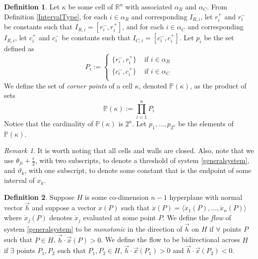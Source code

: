\documentclass[12pt]{article}
\theoremstyle{definition}
\newtheorem{defn}{Definition}[section]
\theoremstyle{remark}
\newtheorem*{remark}{Remark}
\newcommand{\bbR}{\mathbb{R}} %
\newcommand{\bbP}{\mathbb{P}}
\begin{document}
\begin{defn}
Let $\kappa$ be some cell of $\bbR^n$ with associated $\alpha_R$ and $\alpha_C$. From Definition \ref{IntervalType}, for each $i\in\alpha_R$ and corresponding $I_{R,i}$, let $r_i^+$ and $r_i^-$ be constants such that $I_{R,i}=[r_i^-,r_i^+]$, and for each $i\in\alpha_C$ and corresponding $I_{R,i}$, let $c_i^+$ and $c_i^-$ be constants such that $I_{C,i}=[c_i^-,c_i^+]$. Let $p_i$ be the set defined as 
\begin{equation*}
P_i :=
\begin{cases}
\{r_i^-,r_i^+\} &  \text{ if } i\in \alpha_R \\
\{c_i^-,c_i^+\} &  \text{ if } i\in \alpha_C \\
\end{cases}
\end{equation*}
We define the set of \textit{corner points} of a cell $\kappa$, denoted $\bbP(\kappa)$, as the product of sets 
\begin{equation*}
\bbP (\kappa) := \prod_{i=1}^n P_i
\end{equation*}
Notice that the cardinality of $\bbP (\kappa)$ is $2^n$. Let $p_1,\dots,p_{2^n}$ be the elements of $\bbP (\kappa)$.
\end{defn}

\begin{remark}
It is worth noting that all cells and walls are closed. Also, note that we use $\theta_{ji}+\frac{\epsilon}{2}$, with two subscripts, to denote a threshold of system \eqref{generalsystem}, and $\vartheta_k$, with one subscript, to denote some constant that is the endpoint of some interval of $x_k$.
\end{remark}

\begin{defn} \label{flowDefn}
Suppose $H$ is some co-dimension $n-1$ hyperplane with normal vector $\vec{h}$ and suppose a vector $\dot{x}(P)$ such that $\dot{x}(P)=\langle \dot{x}_1(P),\dots,\dot{x}_n(P) \rangle$ where $\dot{x}_j(P)$ denotes $\dot{x}_j$ evaluated at some point $P$. We define the \textit{flow} of system \eqref{generalsystem} to be \textit{monotonic} in the direction of $\vec{h}$ on $H$ if $\forall$ points $P$ such that $P\in H$, $\vec{h}\cdot\vec{x}(P)>0$. 
We define the flow to be bidirectional across $H$ if $\exists$ points $P_1,P_2$ such that $P_1,P_2 \in H$, $\vec{h}\cdot\vec{x}(P_1)>0$ and $\vec{h}\cdot\vec{x}(P_2)<0$.
\end{defn}
\end{document}
